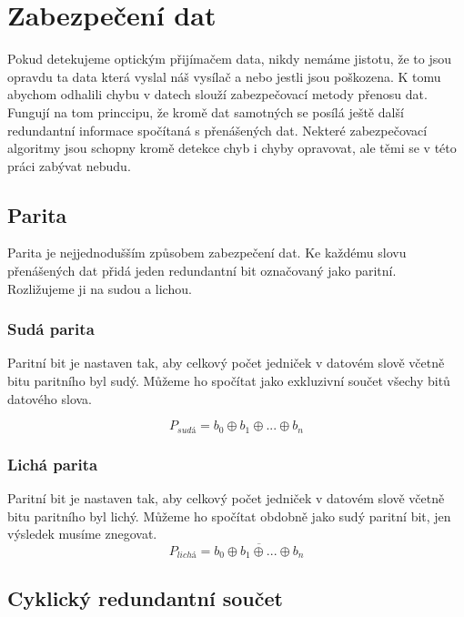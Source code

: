 \section{Zabezpečení dat}
Pokud detekujeme optickým přijímačem data, nikdy nemáme jistotu, že to jsou opravdu ta data která vyslal náš vysílač a nebo jestli jsou poškozena. K tomu abychom odhalili chybu v datech slouží zabezpečovací metody přenosu dat. Fungují na tom princcipu, že kromě dat samotných se posílá ještě další redundantní informace spočítaná s přenášených dat. Nekteré zabezpečovací algoritmy jsou schopny kromě detekce chyb i chyby opravovat, ale těmi se v této práci zabývat nebudu.

\subsection{Parita}
Parita je nejjednodušším způsobem zabezpečení dat. Ke každému slovu přenášených dat přidá jeden redundantní bit označovaný jako paritní. Rozližujeme ji na sudou a lichou.

\subsubsection{Sudá parita}
Paritní bit je nastaven tak, aby celkový počet jedniček v datovém slově včetně bitu paritního byl sudý. Můžeme ho spočítat jako exkluzivní součet všechy bitů datového slova.

$$ P_{sudá} = b_0 \oplus b_1 \oplus ... \oplus b_n $$

\subsubsection{Lichá parita}
Paritní bit je nastaven tak, aby celkový počet jedniček v datovém slově včetně bitu paritního byl lichý. Můžeme ho spočítat obdobně jako sudý paritní bit, jen výsledek musíme znegovat.
$$ P_{lichá} = \overline{ b_0 \oplus b_1 \oplus ... \oplus b_n } $$


\subsection{Cyklický redundantní součet}
